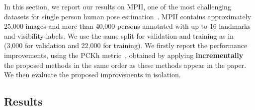 \documentclass[10pt,twocolumn,letterpaper]{article}
\begin{document}
In this section, we report our results on MPII, one of the most challenging datasets for single person human pose estimation~\cite{andriluka20142d}. MPII contains approximately 25,000 images and more than 40,000 persons annotated with up to 16 landmarks and visibility labels. We use the same split for validation and training as in~\cite{tompson2014joint} (3,000 for validation and 22,000 for training). We firstly report the performance improvements, using the PCKh metric~\cite{andriluka20142d}, obtained by applying \textbf{incrementally} the proposed methods in the same order as these methods appear in the paper. We then evaluate the proposed improvements in isolation.





\subsection{Results}
\end{document}
